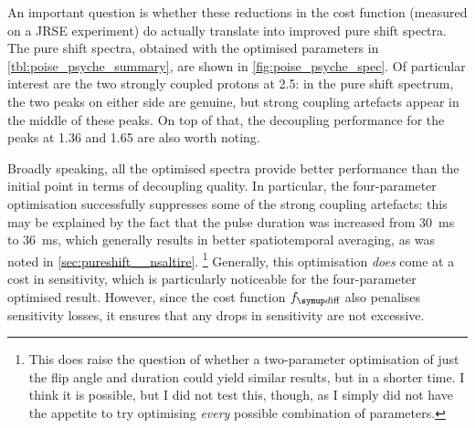 An important question is whether these reductions in the cost function (measured on a JRSE experiment) do actually translate into improved pure shift spectra.
The pure shift spectra, obtained with the optimised parameters in \cref{tbl:poise_psyche_summary}, are shown in \cref{fig:poise_psyche_spec}.
Of particular interest are the two strongly coupled protons at \qty{2.5}{\ppm}: in the pure shift spectrum, the two peaks on either side are genuine, but strong coupling artefacts appear in the middle of these peaks.
On top of that, the decoupling performance for the peaks at \qty{1.36}{\ppm} and \qty{1.65}{\ppm} are also worth noting.

Broadly speaking, all the optimised spectra provide better performance than the initial point in terms of decoupling quality.
In particular, the four-parameter optimisation successfully suppresses some of the strong coupling artefacts: this may be explained by the fact that the pulse duration was increased from \qty{30}{\ms} to \qty{36}{\ms}, which generally results in better spatiotemporal averaging, as was noted in \cref{sec:pureshift__nsaltire}.%
\footnote{This does raise the question of whether a two-parameter optimisation of just the flip angle and duration could yield similar results, but in a shorter time. I think it is possible, but I did not test this, though, as I simply did not have the appetite to try optimising \textit{every} possible combination of parameters.}
Generally, this optimisation \textit{does} come at a cost in sensitivity, which is particularly noticeable for the four-parameter optimised result.
However, since the cost function $\fdiff$ also penalises sensitivity losses, it ensures that any drops in sensitivity are not excessive.

